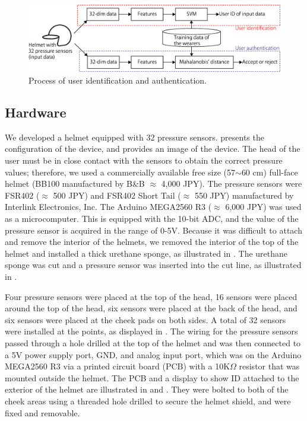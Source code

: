 \documentclass[english,preprint,JIP]{ipsj}
\begin{document}
\begin{figure}[!t]
  \centering
    \includegraphics[width=1\linewidth]{figure/system.eps}
  \caption{Process of user identification and authentication.}
  \label{fig:system}
\end{figure}



\subsection{Hardware}
We developed a helmet equipped with 32 pressure sensors.  presents the configuration of the device, and  provides an image of the device. The head of the user must be in close contact with the sensors to obtain the correct pressure values; therefore, we used a commercially available free size (57$\sim$60 cm) full-face helmet (BB100 manufactured by B\&B $\approx$ 4,000 JPY). The pressure sensors were FSR402 ($\approx$ 500 JPY) and FSR402 Short Tail ($\approx$ 550 JPY) manufactured by Interlink Electronics, Inc. The Arduino MEGA2560 R3 ($\approx$ 6,000 JPY) was used as a microcomputer. This is equipped with the 10-bit ADC, and the value of the pressure sensor is acquired in the range of 0-5V. Because it was difficult to attach and remove the interior of the helmets, we removed the interior of the top of the helmet and installed a thick urethane sponge, as illustrated in . The urethane sponge was cut and a pressure sensor was inserted into the cut line, as illustrated in .\par

Four pressure sensors were placed at the top of the head, 16 sensors were placed around the top of the head, six sensors were placed at the back of the head, and six sensors were placed at the cheek pads on both sides. A total of 32 sensors were installed at the points, as displayed in . The wiring for the pressure sensors passed through a hole drilled at the top of the helmet and was then connected to a 5V power supply port, GND, and analog input port, which was on the Arduino MEGA2560 R3 via a printed circuit board (PCB) with a 10K$\Omega$ resistor that was mounted outside the helmet. The PCB and a display to show ID attached to the exterior of the helmet are illustrated in  and . They were bolted to both of the cheek areas using a threaded hole drilled to secure the helmet shield, and were fixed and removable.\par
\end{document}

